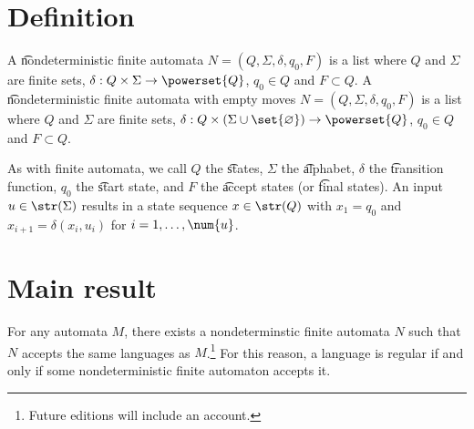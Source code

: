 
\section*{Definition}

A \t{nondeterministic finite automata} $N = (Q, \Sigma , \delta , q_0, F)$ is a list where $Q$ and $\Sigma $ are finite sets, $\delta : Q \times  \Sigma  \to \powerset{Q}$, $q_0 \in Q$ and $F \subset Q$.
A \t{nondeterministic finite automata with empty moves} $N = (Q, \Sigma , \delta , q_0, F)$ is a list where $Q$ and $\Sigma $ are finite sets, $\delta : Q \times  (\Sigma  \cup \set{\varnothing}) \to \powerset{Q}$, $q_0 \in Q$ and $F \subset Q$.

As with finite automata, we call $Q$ the \t{states}, $\Sigma $ the \t{alphabet}, $\delta $ the \t{transition function}, $q_0$ the \t{start state}, and $F$ the \t{accept states} (or \t{final states}).
An input $u \in \str(\Sigma )$ results in a state sequence $x \in \str(Q)$ with $x_1 = q_0$ and $x_{i+1} = \delta (x_i, u_i)$ for $i = 1, \dots , \num{u}$.

\section*{Main result}

For any automata $M$, there exists a nondeterminstic finite automata $N$ such that $N$ accepts the same languages as $M$.\footnote{Future editions will include an account.}
For this reason, a language is regular if and only if some nondeterministic finite automaton accepts it.

\blankpage